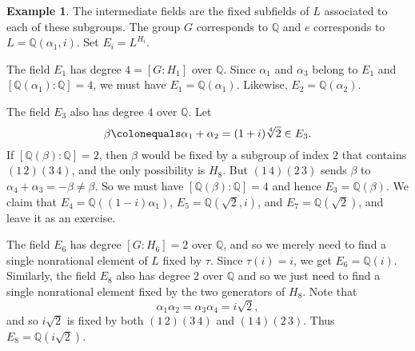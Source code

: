 \documentclass[12pt]{report}
\numberwithin{equation}{section}
\numberwithin{theorem}{chapter}
\theoremstyle{definition}
\newtheorem{example}[theorem]{Example}
\newtheorem*{basic properties}{Basic Properties}
\newtheorem*{Important Remark}{Important Remark}
\begin{document}
\begin{example}

The intermediate fields are the fixed subfields of $L$ associated to each of these subgroups. The group $G$ corresponds to $\mathbb{Q}$ and $e$ corresponds to $L = \mathbb{Q}(\alpha_1, i)$. Set $E_i = L^{H_i}$.

The field $E_1$ has degree $4 = [G:H_1]$ over $\mathbb{Q}$. Since $\alpha_1$ and $\alpha_3$ belong to $E_1$ and $[\mathbb{Q}(\alpha_1):\mathbb{Q}]=4$, we must have $E_1 = \mathbb{Q}(\alpha_1)$. Likewise, $E_2 = \mathbb{Q}(\alpha_2)$.

The field $E_3$ also has degree $4$ over $\mathbb{Q}$. Let 
$$\beta \colonequals \alpha_1 + \alpha_2 = (1+i)\sqrt[4]{2} \in E_3.$$ 
If $[\mathbb{Q}(\beta):\mathbb{Q}] = 2$, then $\beta$ would be fixed by a subgroup of index $2$ that contains $(1 \, 2)(3 \, 4)$, and the only possibility is $H_8$. But $(1 \, 4)(2 \, 3)$ sends $\beta$ to $\alpha_4 + \alpha_3 = - \beta \neq \beta$. So we must have $[\mathbb{Q}(\beta):\mathbb{Q}] = 4$ and hence $E_3 = \mathbb{Q}(\beta)$.
We claim that $E_4 = \mathbb{Q}((1-i) \alpha_1)$, $E_5 = \mathbb{Q}(\sqrt{2},i)$, and $E_7 = \mathbb{Q}(\sqrt{2})$, and leave it as an exercise.


The field $E_6$ has degree $[G:H_6] = 2$ over $\mathbb{Q}$, and so we merely need to find a single nonrational element of $L$ fixed by $\tau$. Since $\tau(i) = i$, we get $E_6 = \mathbb{Q}(i)$.
Similarly, the field $E_8$ also has degree $2$ over $\mathbb{Q}$ and so we just need to find a single nonrational element fixed by the two generators of $H_8$.
Note that
$$\alpha_1 \alpha_2 = \alpha_3 \alpha_4 = i \sqrt{2},$$ 
and so $i \sqrt{2}$ is fixed by both $(1 \, 2)(3 \, 4)$ and  $(1 \,4)(2 \, 3)$. Thus $E_8 =\mathbb{Q}(i \sqrt{2})$.


\end{example}
\end{document}
